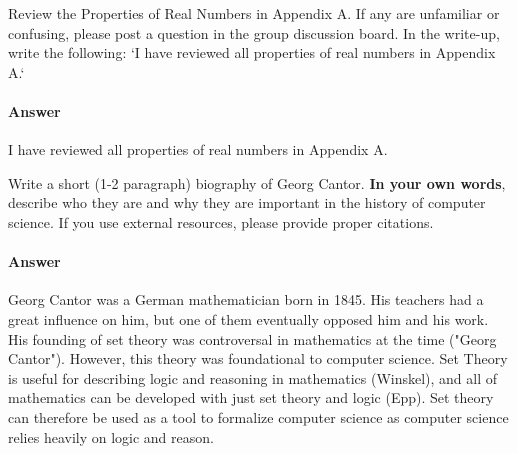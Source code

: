 \documentclass{article}
\begin{document}

Review the Properties of Real Numbers in Appendix A.  If any are unfamiliar or
confusing, please post a question in the group discussion board.  In the
write-up, write the following: `I have reviewed all properties of real numbers
in Appendix A.`

	\paragraph{Answer} I have reviewed all properties of real numbers in Appendix A.



Write a short (1-2 paragraph) biography of Georg Cantor.
\textbf{In your own words}, describe who they are and why they are important in
the history of computer science.  If you use external resources, please provide
proper citations.

\paragraph{Answer} 


Georg Cantor was a German mathematician born in 1845. His teachers had a great 
influence on him, but one of them eventually opposed him and his work. His founding 
of set theory was controversal in mathematics at the time ("Georg Cantor"). However, this theory was 
foundational to computer science. Set Theory is useful for describing logic and 
reasoning in mathematics (Winskel), and all of mathematics can be developed with just set 
theory and logic (Epp). Set theory can therefore be used as a tool to formalize computer 
science as computer science relies heavily on logic and reason.

\parbox[t]{\linewidth}{\hangindent=5mm }

\parbox[t]{\linewidth}{\hangindent=5mm }

\end{document}
